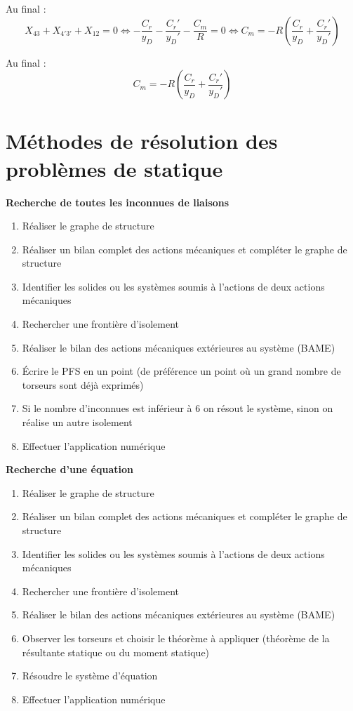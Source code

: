 \documentclass[10pt]{article}
\begin{document}
Au final :
$$
X_{43}+X_{4'3'}+X_{12}=0 
\Longleftrightarrow
-\dfrac{C_r}{y_D}-\dfrac{C_r'}{y_D'}-\dfrac{C_m}{R}=0 
\Longleftrightarrow
C_m=-R\left(\dfrac{C_r}{y_D}+\dfrac{C_r'}{y_D'}\right)
$$

\begin{resultat}
Au final :
$$
C_m=-R\left(\dfrac{C_r}{y_D}+\dfrac{C_r'}{y_D'}\right)
$$
\end{resultat}


\section{Méthodes de résolution des problèmes de statique}
\begin{methode}
\textbf{Recherche de toutes les inconnues de liaisons}

\begin{enumerate}
\item Réaliser le graphe de structure
\item Réaliser un bilan complet des actions mécaniques et compléter le graphe de structure
\item Identifier les solides ou les systèmes soumis à l'actions de deux actions mécaniques
\item Rechercher une frontière d'isolement
\item Réaliser le bilan des actions mécaniques extérieures au système (BAME)
\item Écrire le PFS en un point (de préférence un point où un grand nombre de torseurs sont déjà exprimés)
\item Si le nombre d'inconnues est inférieur à 6 on résout le système, sinon on réalise un autre isolement
\item Effectuer l'application numérique
\end{enumerate}
\end{methode}

\begin{methode}
\textbf{Recherche d'une équation}

\begin{enumerate}
\item Réaliser le graphe de structure
\item Réaliser un bilan complet des actions mécaniques et compléter le graphe de structure
\item Identifier les solides ou les systèmes soumis à l'actions de deux actions mécaniques
\item Rechercher une frontière d'isolement
\item Réaliser le bilan des actions mécaniques extérieures au système (BAME)
\item Observer les torseurs et choisir le théorème à appliquer (théorème de la résultante statique ou du moment statique)
\item Résoudre le système d'équation
\item Effectuer l'application numérique
\end{enumerate}
\end{methode}


\begin{thebibliography}{2}
\end{thebibliography}
\end{document}
